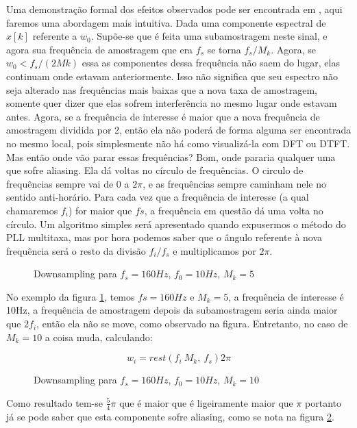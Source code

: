\indent Uma demonstração formal dos efeitos observados pode ser encontrada em \cite{mitra2006digital}, aqui faremos uma abordagem mais intuitiva. Dada uma componente espectral de $x[k]$ referente a $w_0$. Supõe-se que é feita uma subamostragem neste sinal, e agora sua frequência de amostragem que era $f_s$ se torna $f_s/M_k$. Agora, se $w_0<f_s/(2Mk)$ essa as componentes dessa frequência não saem do lugar, elas continuam onde estavam anteriormente. Isso não significa que seu espectro não seja alterado nas frequências mais baixas que a nova taxa de amostragem, somente quer dizer que elas sofrem interferência no mesmo lugar onde estavam antes. Agora, se a frequência de interesse é maior que a nova frequência de amostragem dividida por 2, então ela não poderá de forma alguma ser encontrada no mesmo local, pois simplesmente não há como visualizá-la com DFT ou DTFT. Mas então onde vão parar essas frequências? Bom, onde pararia qualquer uma que sofre aliasing. Ela dá voltas no círculo de frequências. O circulo de frequências sempre vai de 0 a $2\pi$, e as frequências sempre caminham nele no sentido anti-horário. Para cada vez que a frequência de interesse (a qual chamaremos $f_i$) for maior que $fs$, a frequência em questão dá uma volta no círculo. Um algoritmo simples será apresentado quando expusermos o método do PLL multitaxa, mas por hora podemos saber que o ângulo referente à nova frequência será o resto da divisão $f_i/f_s$ e multiplicamos por $2\pi$. 

\begin{figure}[H]
	\centering
	\def\svgwidth{\columnwidth}
	
	\caption{Downsampling para $f_s=160Hz$, $f_0=10Hz$, $M_k=5$}
	\label{fig:no_aliasing}
\end{figure}

No exemplo da figura \ref{fig:no_aliasing}, temos $fs=160Hz$ e $M_k=5$, a frequência de interesse é 10Hz, a frequência de amostragem depois da subamostragem seria ainda maior que $2f_i$, então ela não se move, como observado na figura. Entretanto, no caso de $M_k=10$ a coisa muda, calculando:

\begin{equation}
w_i=rest(f_i \: M_k, \: f_s)2\pi
\end{equation}

\begin{figure}[H]
	\centering
	\def\svgwidth{\columnwidth}
	
	\caption{Downsampling para $f_s=160Hz$, $f_0=10Hz$, $M_k=10$}
	\label{fig:aliasing}
\end{figure}

Como resultado tem-se $\frac{5}{4}\pi$ que é maior que é ligeiramente maior que $\pi$ portanto já se pode saber que esta componente sofre aliasing, como se nota na figura \ref{fig:aliasing}.